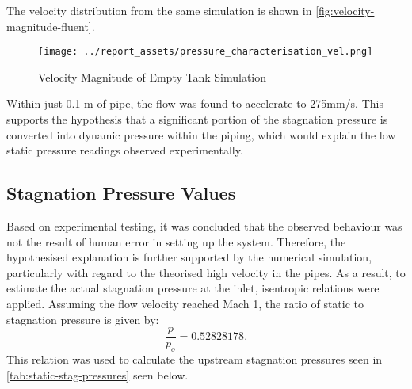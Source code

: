 The velocity distribution from the same simulation is shown in \autoref{fig:velocity-magnitude-fluent}.
\begin{figure}[htbp]
    \centering
    
    \begin{minipage}{0.9\textwidth}
        \centering
        \texttt{[image: ../report\_assets/pressure\_characterisation\_vel.png]}
        \caption{Velocity Magnitude of Empty Tank Simulation}\label{fig:velocity-magnitude-fluent}
    \end{minipage}    
    
\end{figure}    
Within just 0.1 m of pipe, the flow was found to accelerate to 275mm/s. This supports the hypothesis that a significant portion of the stagnation pressure is converted into dynamic pressure within the piping, which would explain the low static pressure readings observed experimentally.

\subsection{Stagnation Pressure Values}
Based on experimental testing, it was concluded that the observed behaviour was not the result of human error in setting up the system. Therefore, the hypothesised explanation is further supported by the numerical simulation, particularly with regard to the theorised high velocity in the pipes. As a result, to estimate the actual stagnation pressure at the inlet, isentropic relations were applied. Assuming the flow velocity reached Mach 1, the ratio of static to stagnation pressure is given by:
\[
\frac{p}{p_o} = 0.52828178.
\]
This relation was used to calculate the upstream stagnation pressures seen in \autoref{tab:static-stag-pressures} seen below.

    
